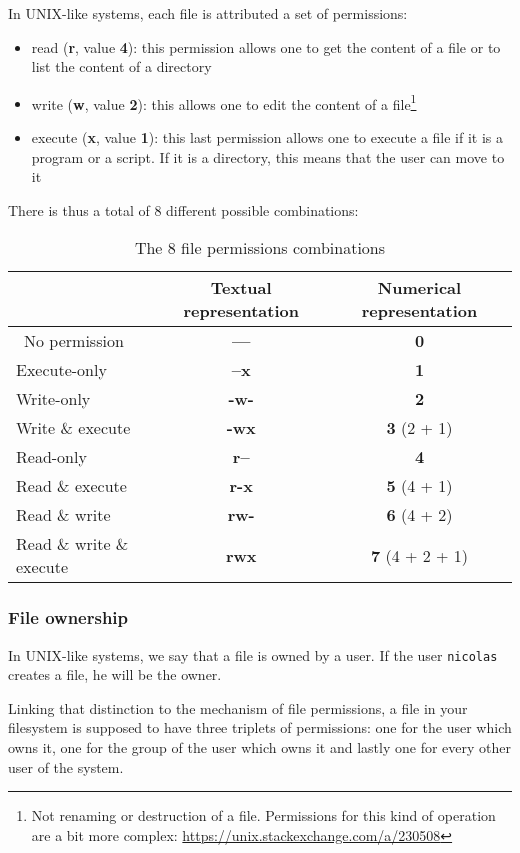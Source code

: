 \documentclass[12pt]{article}
\begin{document}
In UNIX-like systems, each file is attributed a set of permissions:
\begin{itemize}
	\item read (\textbf{r}, value \textbf{4}): this permission allows one to get the content of a file or to list the content of a directory
	\item write (\textbf{w}, value \textbf{2}): this allows one to edit the content of a file\footnote{Not renaming or destruction of a file. Permissions for this kind of operation are a bit more complex: \url{https://unix.stackexchange.com/a/230508}}
	\item execute (\textbf{x}, value \textbf{1}): this last permission allows one to execute a file if it is a program or a script. If it is a directory, this means that the user can move to it
\end{itemize}

There is thus a total of 8 different possible combinations:
 
\begin{table}[ht]
\centering
\begin{tabular}[t]{lcc}
\toprule
&Textual representation &Numerical representation\\
\midrule\
No permission&\textbf{---}&\textbf{0}\\
Execute-only&\textbf{--x}&\textbf{1}\\
Write-only&\textbf{-w-}&\textbf{2}\\
Write \& execute&\textbf{-wx}&\textbf{3} (2 + 1)\\
Read-only&\textbf{r--}&\textbf{4}\\
Read \& execute&\textbf{r-x}&\textbf{5} (4 + 1)\\
Read \& write&\textbf{rw-}&\textbf{6} (4 + 2)\\
Read \& write \& execute&\textbf{rwx}&\textbf{7} (4 + 2 + 1)\\
\bottomrule
\end{tabular}
\caption{The 8 file permissions combinations}
\end{table}%

\subsubsection{File ownership}

In UNIX-like systems, we say that a file is owned by a user. If the user \texttt{nicolas} creates a file, he will be the owner.

Linking that distinction to the mechanism of file permissions, a file in your filesystem is supposed to have three triplets of permissions: one for the user which owns it, one for the group of the user which owns it and lastly one for every other user of the system.
\end{document}
